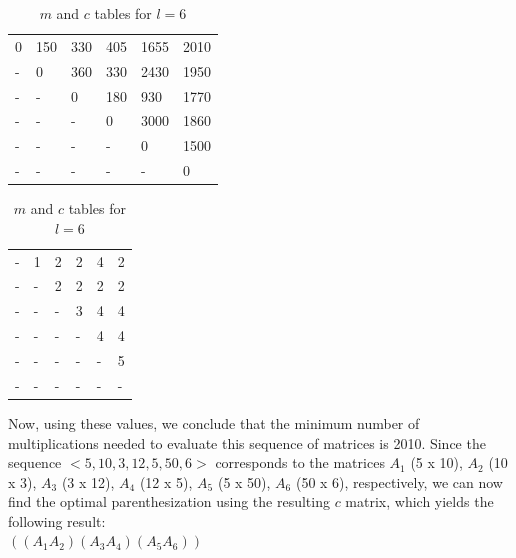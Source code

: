 \documentclass[11pt]{article}
\begin{document}
\begin{sol}
\begin{table}[htbp]
	\centering
	\begin{tabular}{|l|l|l|l|l|l|}
		 \hline
        0 & 150 & 330 & 405 & 1655 & 2010 \\ 
        - & 0 & 360 &330 & 2430 & 1950 \\ 
        - & - & 0 & 180 & 930 & 1770 \\ 
        - & - & - & 0 & 3000 & 1860\\ 
        - & - & - & - & 0 & 1500  \\ 
        - & - & - & - & - & 0 \\
        \hline
	\end{tabular}
	\hspace{20mm}
	\begin{tabular}{|l|l|l|l|l|l|}
		 \hline
        - & 1 & 2 & 2 & 4 & 2 \\ 
        - & - & 2 & 2 & 2 & 2 \\ 
        - & - & - & 3 & 4 & 4 \\ 
        - & - & - & - & 4 & 4 \\ 
        - & - & - & - & - & 5 \\ 
        - & - & - & - & - & - \\
        \hline
	\end{tabular}
	\caption{$m$ and $c$ tables for $l = 6$}
\end{table}

Now, using these values, we conclude that the minimum number of multiplications needed to evaluate this sequence of matrices is 2010. Since the sequence $<5, 10, 3, 12, 5, 50, 6>$ corresponds to the matrices $A_1$ (5 x 10), $A_2$ (10 x 3), $A_3$ (3 x 12), $A_4$ (12 x 5), $A_5$ (5 x 50), $A_6$ (50 x 6), respectively, we can now find the optimal parenthesization using the resulting $c$ matrix, which yields the following result: \\ 

$((A_1A_2)(A_3A_4)(A_5A_6))$

\end{sol}
\end{document}
